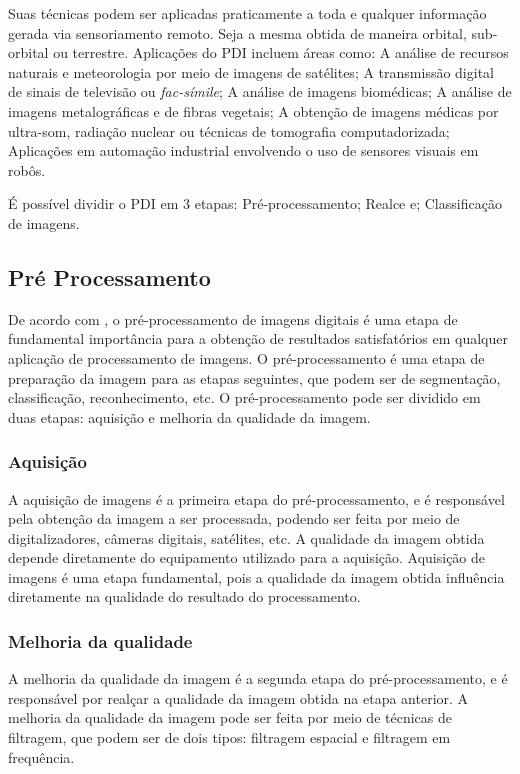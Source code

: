 \documentclass[conference]{IEEEtran}
\begin{document}
Suas técnicas podem ser aplicadas praticamente a toda e qualquer informação gerada via sensoriamento remoto. 
Seja a mesma obtida de maneira orbital, sub-orbital ou terrestre. Aplicações do PDI incluem áreas como: 
A análise de recursos naturais e meteorologia por meio de imagens de satélites; 
A transmissão digital de sinais de televisão ou \emph{fac-símile}; A análise de imagens biomédicas; 
A análise de imagens metalográficas e de fibras vegetais; 
A obtenção de imagens médicas por ultra-som, radiação nuclear ou técnicas de tomografia computadorizada; 
Aplicações em automação industrial envolvendo o uso de sensores visuais em robôs.

É possível dividir o PDI em 3 etapas: Pré-processamento; Realce e; Classificação de imagens.

\subsection{Pré Processamento}

De acordo com \cite{gonzalez2009}, o pré-processamento de imagens digitais é uma etapa de fundamental importância 
para a obtenção de resultados satisfatórios em qualquer aplicação de processamento de imagens. 
O pré-processamento é uma etapa de preparação da imagem para as etapas seguintes, que podem ser de segmentação, 
classificação, reconhecimento, etc. 
O pré-processamento pode ser dividido em duas etapas: aquisição e melhoria da qualidade da imagem.

\subsubsection{Aquisição}

A aquisição de imagens é a primeira etapa do pré-processamento, e é responsável pela obtenção da imagem a ser 
processada, podendo ser feita por meio de digitalizadores, câmeras digitais, satélites, etc. A qualidade da imagem 
obtida depende diretamente do equipamento utilizado para a aquisição. Aquisição de imagens é uma etapa fundamental, 
pois a qualidade da imagem obtida influência diretamente na qualidade do resultado do processamento.

\subsubsection{Melhoria da qualidade}
A melhoria da qualidade da imagem é a segunda etapa do pré-processamento, e é responsável por realçar a qualidade 
da imagem obtida na etapa anterior. A melhoria da qualidade da imagem pode ser feita por meio de técnicas de 
filtragem, que podem ser de dois tipos: filtragem espacial e filtragem em frequência.
\end{document}
